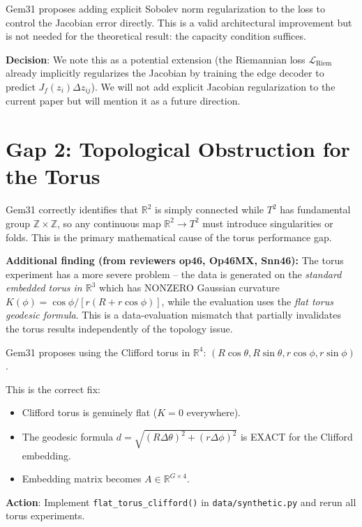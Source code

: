 \documentclass{article}
\begin{document}
\begin{partial}
Gem31 proposes adding explicit Sobolev norm regularization to the loss to control
the Jacobian error directly. This is a valid architectural improvement but is
not needed for the theoretical result: the capacity condition suffices.

\textbf{Decision}: We note this as a potential extension (the Riemannian loss
$\mathcal{L}_{\mathrm{Riem}}$ already implicitly regularizes the Jacobian by
training the edge decoder to predict $J_f(z_i)\Delta z_{ij}$). We will not
add explicit Jacobian regularization to the current paper but will mention it
as a future direction.
\end{partial}

\section{Gap 2: Topological Obstruction for the Torus}

\begin{accept}
Gem31 correctly identifies that $\mathbb{R}^2$ is simply connected while
$T^2$ has fundamental group $\mathbb{Z} \times \mathbb{Z}$, so any continuous
map $\mathbb{R}^2 \to T^2$ must introduce singularities or folds. This is the
primary mathematical cause of the torus performance gap.

\textbf{Additional finding (from reviewers op46, Op46MX, Snn46):} The torus
experiment has a more severe problem -- the data is generated on the
\emph{standard embedded torus in $\mathbb{R}^3$} which has NONZERO Gaussian
curvature $K(\phi) = \cos\phi / [r(R+r\cos\phi)]$, while the evaluation uses
the \emph{flat torus geodesic formula}. This is a data-evaluation mismatch
that partially invalidates the torus results independently of the topology issue.
\end{accept}

\begin{accept}
Gem31 proposes using the Clifford torus in $\mathbb{R}^4$:
$(R\cos\theta, R\sin\theta, r\cos\phi, r\sin\phi)$.

This is the correct fix:
\begin{itemize}
  \item Clifford torus is genuinely flat ($K = 0$ everywhere).
  \item The geodesic formula $d = \sqrt{(R\Delta\theta)^2 + (r\Delta\phi)^2}$
    is EXACT for the Clifford embedding.
  \item Embedding matrix becomes $A \in \mathbb{R}^{G \times 4}$.
\end{itemize}

\textbf{Action}: Implement \texttt{flat\_torus\_clifford()} in
\texttt{data/synthetic.py} and rerun all torus experiments.
\end{accept}
\end{document}

